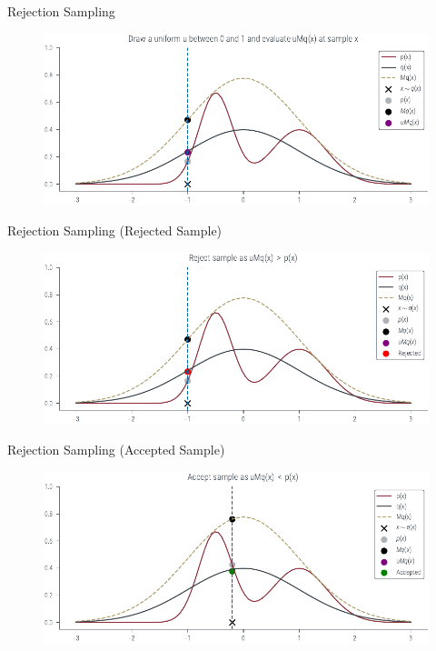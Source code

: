 \documentclass{beamer}
\begin{document}
    \begin{frame}{Rejection Sampling}
        \begin{figure}
            \centering
            \includegraphics[scale = 0.75]{../figures/sampling/rejection-sampling--1.0-True-True-True-True-True-True-True-False.pdf}
        \end{figure}
    \end{frame}

    \begin{frame}{Rejection Sampling (Rejected Sample)}
        \begin{figure}
            \centering
            \includegraphics[scale = 0.75]{../figures/sampling/rejection-sampling--1.0-True-True-True-True-True-True-True-True.pdf}
        \end{figure}
    \end{frame}


    \begin{frame}{Rejection Sampling (Accepted Sample)}
        \begin{figure}
            \centering
            \includegraphics[scale = 0.75]{../figures/sampling/rejection-sampling--0.2-True-True-True-True-True-True-True-True.pdf}
        \end{figure}
    \end{frame}
\end{document}
